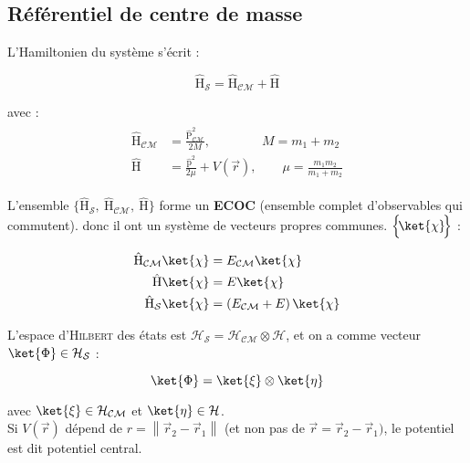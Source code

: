 \documentclass[12pt,a4paper,oneside,french]{book}
\newcommand{\opr}[1]{\mathrm{\hat{#1}}}
\theoremstyle{definition}
\theoremstyle{definition}
\theoremstyle{definition}
\theoremstyle{remark}
\theoremstyle{definition}
\begin{document}
    \subsection{Référentiel de centre de masse}
    L'Hamiltonien du système s'écrit :
    
    \begin{equation*}
        {\opr{H}}_{\mathcal{S}} = {\opr{H}}_{\mathcal{CM}} + \opr{H}
    \end{equation*}
    
    avec :
    \begin{align*}
    \begin{split}
        {\opr{H}}_{\mathcal{CM}} &= \frac{{\opr{P}}_{\mathcal{CM}}^{2}}{2 M}, \qquad\qquad M = {m}_{1} + {m}_{2} \\
        \opr{H} &= \frac{{\opr{p}}^{2}}{2 \mu} + V(\vec{r}), \qquad \mu = \frac{{m}_{1} {m}_{2}}{{m}_{1} + {m}_{2}}
    \end{split}
    \end{align*}
    
    L'ensemble $\Big\{{\opr{H}}_{\mathcal{S}}, \ {\opr{H}}_{\mathcal{CM}}, \ \opr{H}\Big\}$ forme un \textbf{ECOC} (ensemble complet d'observables qui commutent). donc il ont un système de vecteurs propres communes. $\Big\{\!\ket{\chi}\!\Big\}$ :
    
    \begin{align*}
    \begin{split}
        {\opr{H}}_{\mathcal{CM}} \ket{\chi} &= {E}_{\mathcal{CM}} \ket{\chi} \\
        \opr{H} \ket{\chi} &= E \ket{\chi} \\
        {\opr{H}}_{\mathcal{S}} \ket{\chi} &= \left({E}_{\mathcal{CM}} + E \right) \ket{\chi}
    \end{split}
    \end{align*}
    
    L'espace d'\textsc{Hilbert} des états est ${\mathcal{H}}_{\mathcal{S}} = {\mathcal{H}}_{\mathcal{CM}} \otimes \mathcal{H}$, et on a comme vecteur $\ket{\Phi} \in {\mathcal{H}}_{\mathcal{S}}$ :
    
    \begin{equation*}
        \ket{\Phi} = \ket{\xi} \otimes \ket{\eta}
    \end{equation*}
    
    avec $\ket{\xi} \in {\mathcal{H}}_{\mathcal{CM}}$ et $\ket{\eta} \in \mathcal{H}$. \\
    
    Si $V(\vec{r})$ dépend de $r = \left\lVert{\vec{r}}_{2} - {\vec{r}}_{1}\right\rVert$ (et non pas de $\vec{r} = {\vec{r}}_{2} - {\vec{r}}_{1})$, le potentiel est dit potentiel central. \\
    
\end{document}

